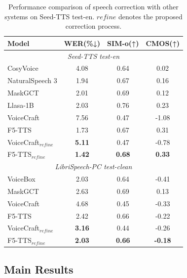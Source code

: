 \documentclass[letterpaper]{article} %
\begin{document}
\begin{table}[t]
\centering
\small
\renewcommand{\arraystretch}{1.2}
\setlength{\tabcolsep}{1.0pt}
\begin{tabular}{lccc}
\hline
\toprule
\textbf{Model} & \textbf{WER(\%↓)} & \textbf{SIM-o}(↑) & \textbf{CMOS(↑)} \\ \hline
\multicolumn{4}{c}{\textit{Seed-TTS test-en}} \\ \hline
CosyVoice\cite{du2024cosyvoice} & 4.08 & 0.64 & 0.02 \\ 
NaturalSpeech 3\cite{ju2024naturalspeech}  & 1.94 & 0.67 & 0.16 \\ 
MaskGCT\cite{wang2024maskgct} & 2.01 & 0.69 & 0.12 \\
Llasa-1B\cite{ye2025llasa} & 2.03 & 0.76 & 0.23 \\ 
VoiceCraft\cite{peng2024voicecraft} & 7.56 & 0.47 & -1.08 \\ 
F5-TTS\cite{chen2024f5} & 1.73 & 0.67 & 0.31 \\ \hline
VoiceCraft$_{refine}$ & \textbf{5.11} & 0.47 & -0.78 \\ 
F5-TTS$_{refine}$ & \textbf{1.42} & \textbf{0.68} & \textbf{0.33} \\ \hline
\multicolumn{4}{c}{\textit{LibriSpeech-PC test-clean}} \\ \hline
VoiceBox\cite{le2023voicebox} & 2.03 & 0.64 & -0.41 \\ 
MaskGCT & 2.63 & 0.69 & 0.13 \\
VoiceCraft & 4.68 & 0.45 & -0.33 \\ 
F5-TTS & 2.42 & 0.66 & -0.22 \\ \hline
VoiceCraft$_{refine}$ & \textbf{3.16} & 0.44 & -0.26 \\ 
F5-TTS$_{refine}$ & \textbf{2.03} & \textbf{0.66} & \textbf{-0.18} \\ 
\bottomrule 
\end{tabular}
\caption{Performance comparison of speech correction with other systems on Seed-TTS test-en. $refine$ denotes the proposed correction process.}
\label{tab:refine}
\end{table}
\subsection{Main Results}
\end{document}
